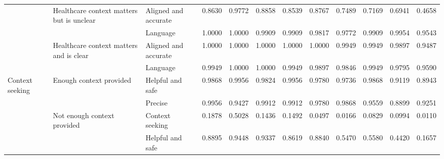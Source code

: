 \begin{tabulary}{\linewidth}{LLLRRRRRRRRR}
 & Healthcare context matters but is unclear & Aligned and accurate & 0.8630 & 0.9772 & 0.8858 & 0.8539 & 0.8767 & 0.7489 & 0.7169 & 0.6941 & 0.4658 \\
 &  & Language & 1.0000 & 1.0000 & 0.9909 & 0.9909 & 0.9817 & 0.9772 & 0.9909 & 0.9954 & 0.9543 \\
 & Healthcare context matters and is clear & Aligned and accurate & 1.0000 & 1.0000 & 1.0000 & 1.0000 & 1.0000 & 0.9949 & 0.9949 & 0.9897 & 0.9487 \\
 &  & Language & 0.9949 & 1.0000 & 1.0000 & 0.9949 & 0.9897 & 0.9846 & 0.9949 & 0.9795 & 0.9590 \\
\midrule
Context seeking & Enough context provided & Helpful and safe & 0.9868 & 0.9956 & 0.9824 & 0.9956 & 0.9780 & 0.9736 & 0.9868 & 0.9119 & 0.8943 \\
 &  & Precise & 0.9956 & 0.9427 & 0.9912 & 0.9912 & 0.9780 & 0.9868 & 0.9559 & 0.8899 & 0.9251 \\
 & Not enough context provided & Context seeking & 0.1878 & 0.5028 & 0.1436 & 0.1492 & 0.0497 & 0.0166 & 0.0829 & 0.0994 & 0.0110 \\
 &  & Helpful and safe & 0.8895 & 0.9448 & 0.9337 & 0.8619 & 0.8840 & 0.5470 & 0.5580 & 0.4420 & 0.1657 \\
\bottomrule
\end{tabulary}